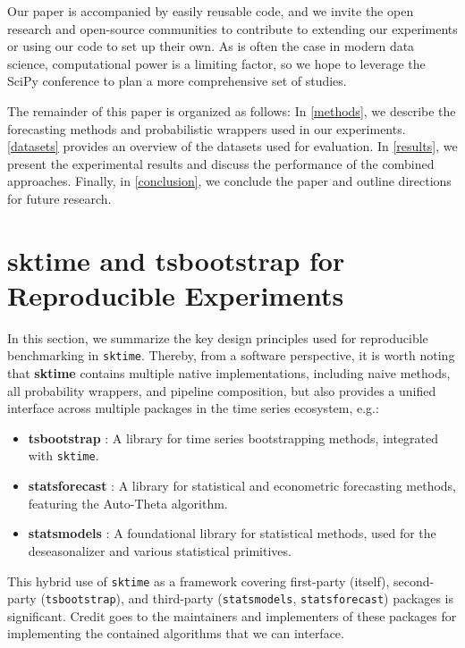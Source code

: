 Our paper is accompanied by easily reusable code, and we invite the open research and open-source communities to contribute to extending our experiments or using our code to set up their own. As is often the case in modern data science, computational power is a limiting factor, so we hope to leverage the SciPy conference to plan a more comprehensive set of studies.

The remainder of this paper is organized as follows: In \autoref{methods}, we describe the forecasting methods and probabilistic wrappers used in our experiments. \autoref{datasets} provides an overview of the datasets used for evaluation. In \autoref{results}, we present the experimental results and discuss the performance of the combined approaches. Finally, in \autoref{conclusion}, we conclude the paper and outline directions for future research.

\section{sktime and tsbootstrap for Reproducible Experiments}\label{sktime}

In this section, we summarize the key design principles used for reproducible benchmarking in \texttt{sktime}. Thereby, from a software perspective, it is  worth noting that \textbf{sktime} \citep{loning2019sktime, franz_kiraly_2024_11095261_sktime} contains multiple native implementations, including naive methods, all probability wrappers, and pipeline composition, but also provides a unified interface across multiple packages in the time series ecosystem, e.g.:

\begin{itemize}
    \item \textbf{tsbootstrap} \citep{gilda_2024_10866090_tsbootstrap, gilda2024tsbootstrap}: A library for time series bootstrapping methods, integrated with \texttt{sktime}.
    \item \textbf{statsforecast} \citep{garza2022statsforecast}: A library for statistical and econometric forecasting methods, featuring the Auto-Theta algorithm.
    \item \textbf{statsmodels} \citep{seabold2010statsmodels}: A foundational library for statistical methods, used for the deseasonalizer and various statistical primitives.
\end{itemize}

This hybrid use of \texttt{sktime} as a framework covering first-party (itself), second-party (\texttt{tsbootstrap}), and third-party (\texttt{statsmodels}, \texttt{statsforecast}) packages is significant.
Credit goes to the maintainers and implementers of these packages for implementing the contained algorithms that we can interface.


